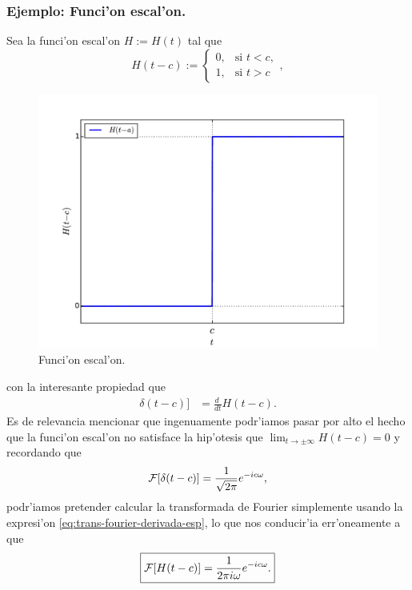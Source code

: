 \subsubsection{Ejemplo: Funci'on escal'on.}
Sea la funci'on escal'on $H:=H(t)$ tal que
\begin{equation}
H(t-c) := 
\begin{cases}
0, &\text{si }t < c,\\
1, &\text{si }t > c
\end{cases},
\end{equation}

\begin{figure}[h]
\centering
\includegraphics[scale=0.4]{figs/fig-funcion-escalon.pdf}
\caption{Funci'on escal'on.}
\label{im:escalon}
\end{figure}
con la interesante propiedad que
\begin{align}
\delta(t-c)] &= \frac{d\ }{dt}H(t-c).
\end{align}
Es de relevancia mencionar que ingenuamente podr'iamos pasar por alto el hecho que la funci'on escal'on no satisface la hip'otesis que $\lim_{t\to\pm\infty}H(t-c)=0$ y recordando que
\begin{align}
{\cal F}[\delta(t-c)]=\frac{1}{\sqrt{2\pi}} e^{-i c\omega},
\end{align}
podr'iamos pretender calcular la transformada de Fourier simplemente usando la expresi'on \eqref{eq:trans-fourier-derivada-esp}, lo que nos conducir'ia err'oneamente a que
\begin{equation}
\boxed{ {\cal F}[H(t-c)] =\frac{1}{2\pi i\omega} e^{-i c\omega}.}
\end{equation}
